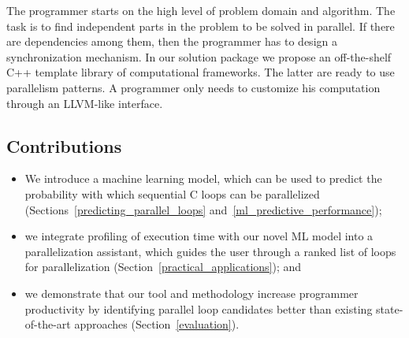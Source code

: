 \quad The programmer starts on the high level of problem domain and algorithm. The task is to find independent parts in the problem to be solved in parallel. If there are dependencies among them, then the programmer has to design a synchronization mechanism. In our solution package we propose an off-the-shelf C++ template library of computational frameworks. The latter are ready to use parallelism patterns. A programmer only needs to customize his computation through an LLVM-like interface.

\subsection{Contributions}
\begin{itemize}
\renewcommand\labelitemi{$\vartriangleright$}
\renewcommand\labelitemii{$\bullet$}
\item We introduce a machine learning model, which can be used to predict the probability with which sequential C loops can be parallelized (Sections~\ref{predicting_parallel_loops} and~\ref{ml_predictive_performance});
\item we integrate profiling of execution time with our novel ML model into a parallelization assistant, which guides the user through a ranked list of loops for parallelization (Section~\ref{practical_applications}); and
\item we demonstrate that our tool and methodology increase programmer productivity by identifying parallel loop candidates better than existing state-of-the-art approaches (Section~\ref{evaluation}).
\end{itemize}

